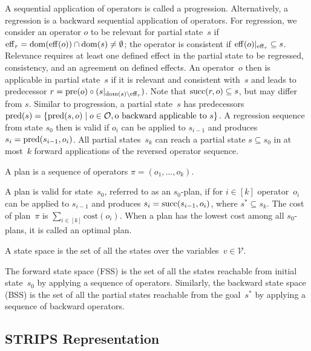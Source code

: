 A sequential application of operators is called a progression. Alternatively, a regression is a backward sequential application of operators. For regression, we consider an operator $o$ to be relevant for partial state~$s$ if $\operatorname{eff}_r=\operatorname{dom}(\operatorname{eff}(o))\cap\operatorname{dom}(s)\neq\emptyset$; the operator is consistent if $\operatorname{eff}(o)|_{\operatorname{eff}_r} \subseteq s$. Relevance requires at least one defined effect in the partial state to be regressed, consistency, and an agreement on defined effects. An operator~$o$ then is  applicable in partial state~$s$ if it is relevant and consistent with~$s$ and leads to predecessor $r=\operatorname{pre}(o)\circ (s|_{\operatorname{dom}(s)\setminus\operatorname{eff}_r})$. Note that $\operatorname{succ}(r,o)\subseteq s$, but may differ from $s$. Similar to progression, a partial state~$s$ has predecessors $\operatorname{pred}(s)=\{\operatorname{pred}(s,o)\mid o\in \mathcal{O}, \text{o backward applicable to }s\}$. A regression sequence from state $s_0$ then is valid if $o_i$ can be applied to $s_{i-1}$ and produces $s_i=\operatorname{pred}(s_{i-1},o_i)$. All partial states~$s_k$ can reach a partial state $s\subseteq s_0$ in at most~$k$ forward applications of the reversed operator sequence.

\begin{definition}[Plan]\label{def:plan}
    A plan is a sequence of operators $\pi=(o_1,\ldots,o_k)$.
\end{definition}

A plan is valid for state~$s_0$, referred to as an $s_0$-plan, if for $i\in[k]$ operator~$o_i$ can be applied to $s_{i-1}$ and produces $s_i=\operatorname{succ}(s_{i-1},o_i)$, where $s^* \subseteq s_k$. The cost of plan~$\pi$ is $\sum_{i\in[k]} \text{cost}(o_i)$. When a plan has the lowest cost among all $s_0$-plans, it is called an optimal plan.

\begin{definition}\label{def:statespace}
    A state space is the set of all the states over the variables~$v \in \mathcal{V}$.
\end{definition}

The forward state space (FSS) is the set of all the states reachable from initial state~$s_0$ by applying a sequence of operators. Similarly, the backward state space (BSS) is the set of all the partial states reachable from the goal~$s^*$ by applying a sequence of backward operators.

\subsection{STRIPS Representation}
\label{sec:background_strips}

